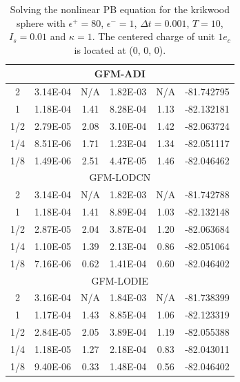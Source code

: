 \begin{table}[!ht]
\begin{tabular}{c c c c c c }
\multicolumn{6}{c}{GFM-ADI} \\ \hline
  2 & 3.14E-04 & N/A & 1.82E-03 & N/A & -81.742795 \\ %
  1 & 1.18E-04 & 1.41 & 8.28E-04 & 1.13 & -82.132181 \\%
1/2 & 2.79E-05 & 2.08 & 3.10E-04 & 1.42 & -82.063724 \\ %
1/4 & 8.51E-06 & 1.71 & 1.23E-04 & 1.34 & -82.051117 \\ %
1/8 & 1.49E-06 & 2.51 & 4.47E-05 & 1.46 & -82.046462 \\ \hline
\multicolumn{6}{c}{GFM-LODCN} \\ \hline
  2 & 3.14E-04 & N/A  & 1.82E-03 & N/A  & -81.742788 \\ %
  1 & 1.18E-04 & 1.41 & 8.89E-04 & 1.03 & -82.132148 \\ %
1/2 & 2.87E-05 & 2.04 & 3.87E-04 & 1.20 & -82.063684 \\ %
1/4 & 1.10E-05 & 1.39 & 2.13E-04 & 0.86 & -82.051064 \\ %
1/8 & 7.16E-06 & 0.62 & 1.41E-04 & 0.60 & -82.046402 \\ \hline
\multicolumn{6}{c}{GFM-LODIE} \\ \hline
2   & 3.16E-04 & N/A   & 1.84E-03 & N/A   & -81.738399 \\ %
1   & 1.17E-04 & 1.43  & 8.85E-04 & 1.06  & -82.123319 \\ %
1/2 & 2.84E-05 & 2.05  & 3.89E-04 & 1.19  & -82.055388 \\ %
1/4 & 1.18E-05 & 1.27  & 2.18E-04 & 0.83  & -82.043011 \\ %
1/8 & 9.40E-06 & 0.33  & 1.48E-04 & 0.56  & -82.046402 \\ \hline
\end{tabular}
\caption{Solving the nonlinear PB equation for the krikwood sphere with $\epsilon^+=80$, $\epsilon^-=1$, $\Delta t = 0.001$, $T=10$, $I_s=0.01$ and $\kappa = 1$. The centered charge of unit $1e_c $ is located at (0, 0, 0).}
\label{tab-krikwood}
\end{table}

